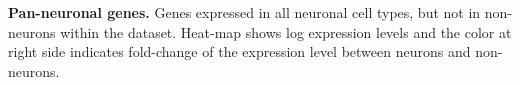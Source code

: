 \textbf{Pan-neuronal genes.} 
Genes expressed in all neuronal cell types, but not in non-neurons within the dataset. Heat-map shows log expression levels and the color at right side indicates fold-change of the expression level between neurons and non-neurons.